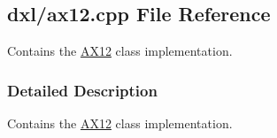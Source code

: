 \hypertarget{a00010}{}\subsection{dxl/ax12.cpp File Reference}
\label{a00010}


Contains the \hyperlink{a00001}{A\+X12} class implementation.  




\subsubsection{Detailed Description}
Contains the \hyperlink{a00001}{A\+X12} class implementation. 

